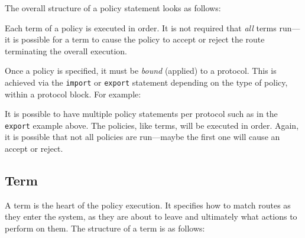 The overall structure of a policy statement looks as follows:

\noindent{}

Each term of a policy is executed in order.  It is not required that {\em all}
terms run---it is possible for a term to cause the policy to accept or
reject the route terminating the overall execution.

Once a policy is specified, it must be {\em bound} (applied) to a protocol.
This is achieved via the {\tt import} or {\tt export} statement depending on
the type of policy, within a protocol block.  For example:

\noindent{}

It is possible to have multiple policy statements per protocol such as in the
{\tt export} example above.  The policies, like terms, will be executed in
order.  Again, it is possible that not all policies are run---maybe the first
one will cause an accept or reject.

\subsection{Term}
A term is the heart of the policy execution.  It specifies how to match routes
as they enter the system, as they are about to leave and ultimately what
actions to perform on them.  The structure of a term is as follows:

